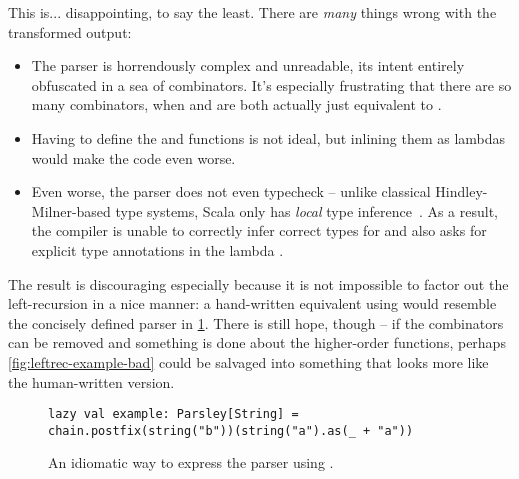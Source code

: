 \documentclass[../../main.tex]{subfiles}
\begin{document}
\noindent %
This is... disappointing, to say the least.
There are \emph{many} things wrong with the transformed output:
\begin{itemize}
  \item The parser is horrendously complex and unreadable, its intent entirely obfuscated in a sea of combinators. It's especially frustrating that there are so many  combinators, when  and  are both actually just equivalent to .
  \item Having to define the  and  functions is not ideal, but inlining them as lambdas would make the code even worse.
  \item Even worse, the parser does not even typecheck -- unlike classical Hindley-Milner-based type systems, Scala only has \emph{local} type inference~\cite{cremet_core_2006}. As a result, the compiler is unable to correctly infer correct types for  and also asks for explicit type annotations in the lambda .
\end{itemize}
The result is discouraging especially because it is not impossible to factor out the left-recursion in a nice manner:
a hand-written equivalent using  would resemble the concisely defined parser in \cref{fig:leftrec-example-hand}.
There is still hope, though -- if the  combinators can be removed and something is done about the higher-order functions, perhaps \cref{fig:leftrec-example-bad} could be salvaged into something that looks more like the human-written version.

\begin{figure}[htbp]
\begin{verbatim}
lazy val example: Parsley[String] = chain.postfix(string("b"))(string("a").as(_ + "a"))
\end{verbatim}
\caption{An idiomatic way to express the  parser using .}
\label{fig:leftrec-example-hand}
\end{figure}
\end{document}

